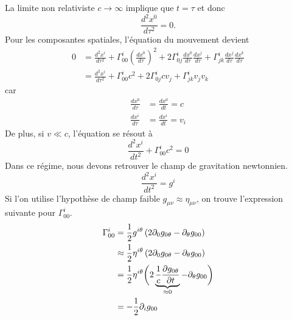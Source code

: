 \documentclass[a4paper,11pt]{report}
\begin{document}
            La limite non relativiste $c\to\infty$ implique que $t = \tau$ et donc
            \begin{equation}
                \frac{d^2x^0}{d\tau^2} = 0.
            \end{equation}
            Pour les composantes spatiales, l'équation du mouvement devient
            \begin{align}
                 0 &=\frac{d^2x^i}{d\tau^2} + \Gamma^i_{00}\left( \frac{dx^0}{d\tau} \right)^2 + 2\Gamma^i_{0j}\frac{dx^0}{d\tau}\frac{dx^j}{d\tau}+\Gamma^i_{jk}\frac{dx^j}{d\tau}\frac{dx^k}{d\tau}\\
                 &= \frac{d^2x^i}{d\tau^2} + \Gamma^i_{00}c^2 + 2\Gamma^i_{0j}cv_j+\Gamma^i_{jk}v_jv_k
            \end{align}
            car
            \begin{align}
                \frac{dx^0}{d\tau} &= \frac{dx^0}{dt} = c \\
                \frac{dx^i}{d\tau} &= \frac{dx^i}{dt} = v_i
            \end{align}
            De plus, si $v\ll c $, l'équation se résout à
            \begin{equation}
                 \frac{d^2x^i}{dt^2} + \Gamma^i_{00}c^2 = 0
            \end{equation}
            Dans ce régime, nous devons retrouver le champ de gravitation newtonnien.
            \begin{equation}
                \frac{d^2x^i}{dt^2} = g^i
            \end{equation}
            Si l'on utilise l'hypothèse de champ faible $g_{\mu\nu}\approx \eta_{\mu\nu}$, on trouve l'expression suivante pour $\Gamma^i_{00}$.
            \begin{align}
                \Gamma^i_{00} &= \frac{1}{2}g^{i\theta}\left( 2\partial_0g_{0\theta}-\partial_\theta g_{00} \right) \\
                &\approx  \frac{1}{2}\eta^{i\theta}\left( 2\partial_0g_{0\theta}-\partial_\theta g_{00} \right) \\
                &=  \frac{1}{2}\eta^{i\theta}\bigg( 2\underbrace{\frac{1}{c}\frac{\partial g_{0\theta}}{\partial t}}_{\approx 0}-\partial_\theta g_{00} \bigg) \\
                &= -\frac{1}{2}\partial_i g_{00}
            \end{align}
            
\end{document}
